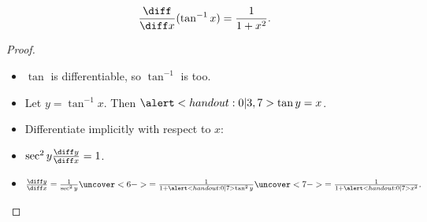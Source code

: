 \begin{frame}
\begin{theorem}
\[
\frac{\diff}{\diff x} (\tan^{-1} x) = \frac{1}{1 + x^2}.
\]
\end{theorem}
\begin{proof}
\begin{itemize}
\item  $\tan$ is differentiable, so $\tan^{-1}$ is too.
\item<2->  Let $y = \tan^{-1} x$.  Then $\alert<handout:0| 3,7>{\tan y = x}$.
\item<3->  Differentiate implicitly with respect to $x$:
\item<4->  $\sec^2 y \frac{\diff y}{\diff x} = 1$.  
\item<5->  $\frac{\diff y}{\diff x} = \frac{1}{\sec^2 y} \uncover<6->{= \frac{1}{1+\alert<handout:0| 7>{\tan^2y}}} \uncover<7->{= \frac{1}{1 + \alert<handout:0| 7>{x^2}}.}$  
\end{itemize}
\end{proof}
\end{frame}
